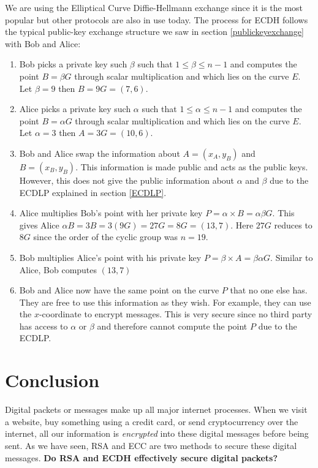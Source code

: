 \documentclass[a4paper,12pt]{article}
\theoremstyle{definition}
\begin{document}
We are using the Elliptical Curve Diffie-Hellmann exchange since it is the most popular but other protocols are also in use today. The process for ECDH follows the typical public-key exchange structure we saw in section \ref{publickeyexchange} with Bob and Alice:
\begin{enumerate}
	\item Bob picks a private key such $\beta$ such that $1 \leq \beta  \leq n-1$ and computes the point $B=\beta G$ through scalar multiplication and which lies on the curve $E$. Let $\beta = 9$ then $B=9G =(7,6)$.
	\item Alice picks a private key such $\alpha$ such that $1 \leq \alpha  \leq n-1$ and computes the point $B=\alpha G$ through scalar multiplication and which lies on the curve $E$. Let $\alpha =3$ then $A=3G=(10,6)$.
	\item Bob and Alice swap the information about $A = (x_A,y_B)$ and $B = (x_B,y_B)$. This information is made public and acts as the public keys. However, this does not give the public information about $\alpha$ and $\beta$ due to the ECDLP explained in section \ref{ECDLP}.
	\item Alice multiplies Bob's point with her private key $P=\alpha \times B= \alpha \beta G$. This gives Alice $\alpha B = 3B = 3(9G) = 27G = 8G = (13,7)$. Here $27G$ reduces to $8G$ since the order of the cyclic group was $n=19$.
	\item Bob multiplies Alice's point with his private key $P=\beta \times A= \beta \alpha G$. Similar to Alice, Bob computes $(13,7)$
	\item Bob and Alice now have the same point on the curve $P$ that no one else has. They are free to use this information as they wish. For example, they can use the $x$-coordinate to encrypt messages. This is very secure since no third party has access to $\alpha$ or $\beta$ and therefore cannot compute the point $P$ due to the ECDLP.
\end{enumerate}

\newpage
\section{Conclusion}


Digital packets or messages make up all major internet processes. When we visit a website, buy something using a credit card, or send cryptocurrency over the internet, all our information is \textit{encrypted} into these digital messages before being sent. As we have seen, RSA and ECC are two methods to secure these digital messages. \textbf{Do RSA and ECDH effectively secure digital packets?}
\end{document}
